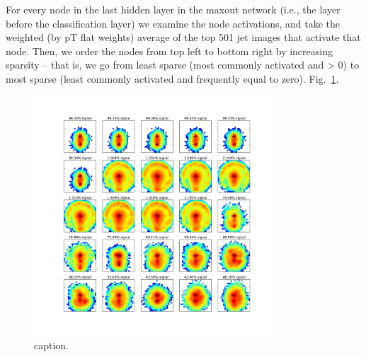 For every node in the last hidden layer in the maxout network (i.e., the layer before the classification layer) we examine the node activations, and take the weighted (by pT flat  weights) average of the top 501 jet images that activate that node. Then, we order the nodes from top left to bottom right by increasing sparsity -- that is, we go from least sparse (most commonly activated and > 0) to most sparse (least commonly activated and frequently equal to zero). Fig.~\ref{fig:mostactiviate}.

\begin{figure}[!htbp]
  \centering
  \includegraphics[width=0.8\textwidth]{figures/maxnodes.pdf}
  \caption{caption.}
  \label{fig:mostactiviate}
\end{figure}


\clearpage
\newpage

